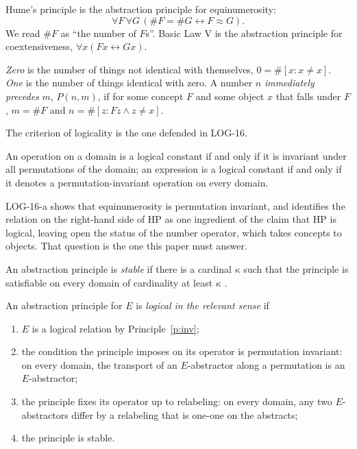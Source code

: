 \documentclass{situationist-preprint}
\begin{document}
\begin{definition}\label{d:hp}
Hume's principle is the abstraction principle for equinumerosity:
\[ \forall F\, \forall G\, (\# F = \# G \leftrightarrow F \approx G). \]
We read $\#F$ as \enquote{the number of $F$s}. Basic Law V is the abstraction principle for coextensiveness, $\forall x (Fx \leftrightarrow Gx)$.
\end{definition}

\begin{definition}[Frege]\label{d:zero}
\emph{Zero} is the number of things not identical with themselves, $0 = \#[x : x \neq x]$. \emph{One} is the number of things identical with zero. A number $n$ \emph{immediately precedes} $m$, $P(n, m)$, if for some concept $F$ and some object $x$ that falls under $F$, $m = \#F$ and $n = \#[z : Fz \wedge z \neq x]$.
\end{definition}

The criterion of logicality is the one defended in LOG-16.

\begin{principle}[Invariance]\label{p:inv}
An operation on a domain is a logical constant if and only if it is invariant under all permutations of the domain; an expression is a logical constant if and only if it denotes a permutation-invariant operation on every domain.
\end{principle}

LOG-16-a shows that equinumerosity is permutation invariant, and identifies the relation on the right-hand side of HP as one ingredient of the claim that HP is logical, leaving open the status of the number operator, which takes concepts to objects. That question is the one this paper must answer.

\begin{definition}[Stability]\label{d:stable}
An abstraction principle is \emph{stable} if there is a cardinal $\kappa$ such that the principle is satisfiable on every domain of cardinality at least $\kappa$ \citep{Fine2002}.
\end{definition}

\begin{definition}\label{d:rel}
An abstraction principle for $E$ is \emph{logical in the relevant sense} if
\begin{enumerate}[label=(\alph*)]
\item $E$ is a logical relation by Principle~\ref{p:inv};
\item the condition the principle imposes on its operator is permutation invariant: on every domain, the transport of an $E$-abstractor along a permutation is an $E$-abstractor;
\item the principle fixes its operator up to relabeling: on every domain, any two $E$-abstractors differ by a relabeling that is one-one on the abstracts;
\item the principle is stable.
\end{enumerate}
\end{definition}
\end{document}
